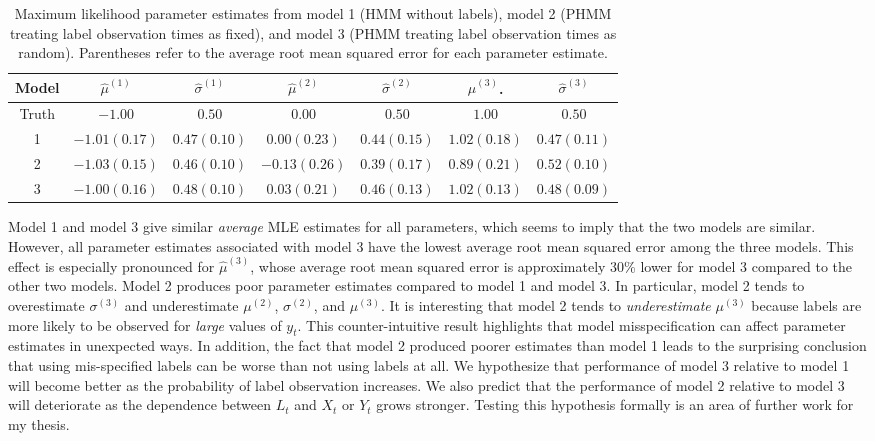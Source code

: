 %
\begin{table}
\centering
\begin{tabular}{c|cc|cc|cc}
Model & $\hat \mu^{(1)}$ & $\hat \sigma^{(1)}$ & $\hat \mu^{(2)}$ & $\hat \sigma^{(2)}$ & $\hat \mu^{(3)}$.       & $\hat \sigma^{(3)}$ \\ \hline
Truth & $-1.00$          & $0.50$              & $0.00$           & $0.50$              & $1.00$                  & $0.50$              \\
1     & $-1.01 (0.17)$   & $0.47 (0.10)$       & $0.00 (0.23)$    & $0.44 (0.15)$       & $1.02 (0.18)$           & $0.47 (0.11)$     \\
2     & $-1.03 (0.15)$   & $0.46 (0.10)$       & $-0.13 (0.26)$   & $0.39 (0.17)$       & $0.89 (0.21)$           & $0.52 (0.10)$     \\
3     & $-1.00 (0.16)$   & $0.48 (0.10)$       & $0.03 (0.21)$    & $0.46 (0.13)$       & $1.02 (\mathbf{0.13})$  & $0.48 (0.09)$
\end{tabular}
\caption{Maximum likelihood parameter estimates from model 1 (HMM without labels), model 2 (PHMM treating label observation times as fixed), and model 3 (PHMM treating label observation times as random). Parentheses refer to the average root mean squared error for each parameter estimate.}
\label{tbl:EDA_PHMM}
\end{table}
%
Model 1 and model 3 give similar \textit{average} MLE estimates for all parameters, which seems to imply that the two models are similar. However, all parameter estimates associated with model 3 have the lowest average root mean squared error among the three models. This effect is especially pronounced for $\hat \mu^{(3)}$, whose average root mean squared error is approximately 30\% lower for model 3 compared to the other two models. 
Model 2 produces poor parameter estimates compared to model 1 and model 3. In particular, model 2 tends to overestimate $\sigma^{(3)}$ and underestimate $\mu^{(2)}$, $\sigma^{(2)}$, and $\mu^{(3)}$. It is interesting that model 2 tends to \textit{underestimate} $\mu^{(3)}$ because labels are more likely to be observed for \textit{large} values of $y_t$. This counter-intuitive result highlights that model misspecification can affect parameter estimates in unexpected ways. In addition, the fact that model 2 produced poorer estimates than model 1 leads to the surprising conclusion that using mis-specified labels can be worse than not using labels at all. We hypothesize that performance of model 3 relative to model 1 will become better as the probability of label observation increases. We also predict that the performance of model 2 relative to model 3 will deteriorate as the dependence between $L_t$ and $X_t$ or $Y_t$ grows stronger. Testing this hypothesis formally is an area of further work for my thesis.